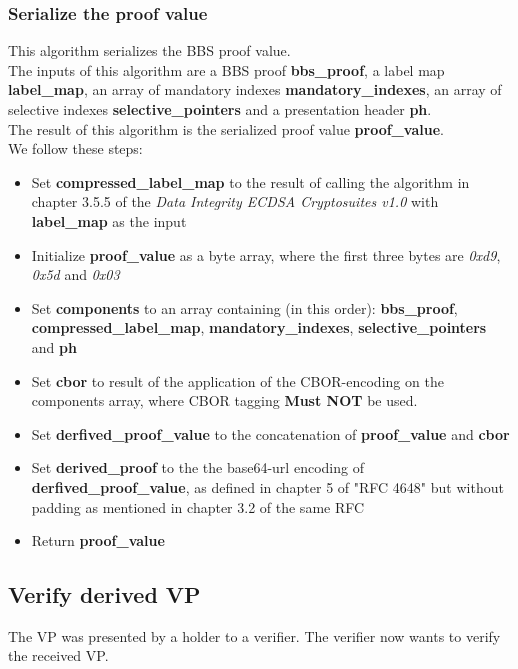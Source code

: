 \documentclass[
	a4paper               %
	,BCOR=0mm            %
	,bibliography=totoc   %
	,listof=totoc         %
	,monolingual
	,twoside=false
]{bfhthesis}              %
\begin{document}
\subsubsection{Serialize the proof value}
\label{subsub:serializebaseproof}
This algorithm serializes the BBS proof value.\\

The inputs of this algorithm are a BBS proof \textbf{bbs\_proof}, a label map \textbf{label\_map}, an array of mandatory indexes \textbf{mandatory\_indexes}, an array of selective indexes \textbf{selective\_pointers} and a presentation header \textbf{ph}.\\

The result of this algorithm is the serialized proof value \textbf{proof\_value}.\\

We follow these steps:
\begin{itemize}
	\item Set \textbf{compressed\_label\_map} to the result of calling the algorithm in chapter 3.5.5 of the \textit{Data Integrity ECDSA Cryptosuites v1.0}\cite{ecdsa} with \textbf{label\_map} as the input
	\item Initialize \textbf{proof\_value} as a byte array, where the first three bytes are \textit{0xd9}, \textit{0x5d} and \textit{0x03}
	\item Set \textbf{components} to an array containing (in this order): \textbf{bbs\_proof}, \textbf{compressed\_label\_map}, \textbf{mandatory\_indexes}, \textbf{selective\_pointers} and \textbf{ph}
	\item Set \textbf{cbor} to result of the application of the CBOR-encoding\cite{cbor} on the components array, where CBOR tagging \textbf{Must NOT} be used.
	\item Set \textbf{derfived\_proof\_value} to the concatenation of \textbf{proof\_value} and \textbf{cbor}
	\item Set \textbf{derived\_proof} to the the base64-url encoding of \textbf{derfived\_proof\_value}, as defined in chapter 5 of "RFC 4648"\cite{base64} but without padding as mentioned in chapter 3.2 of the same RFC
	\item Return \textbf{proof\_value}
\end{itemize}

\subsection{Verify derived VP}
\label{subsub:verifyvp}
The VP was presented by a holder to a verifier. 
The verifier now wants to verify the received VP.\\
\end{document}
